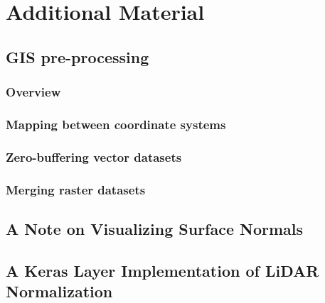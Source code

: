 \chapter{Additional Material}
\label{app:additional}

\section{GIS pre-processing}
\subsection{Overview}%
\label{app:preprocessing-overview}%


\subsection{Mapping between coordinate systems}%
\label{app:srid-change}


\subsection{Zero-buffering vector datasets}%
\label{app:zero-buffer}


\subsection{Merging raster datasets}%
\label{app:raster-merging}


\section{A Note on Visualizing Surface Normals}%
\label{app:normal-visualization}


\section{A Keras Layer Implementation of LiDAR Normalization}%
\label{app:lidar-normalization}

